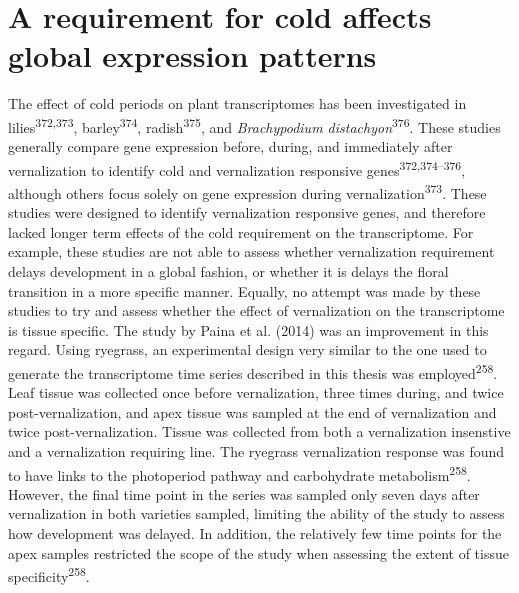 \documentclass[12pt,]{book}
\begin{document}
\section{A requirement for cold affects global expression
patterns}\label{section:winter:global}

The effect of cold periods on plant transcriptomes has been investigated
in lilies\textsuperscript{372,373}, barley\textsuperscript{374},
radish\textsuperscript{375}, and \emph{Brachypodium
distachyon}\textsuperscript{376}. These studies generally compare gene
expression before, during, and immediately after vernalization to
identify cold and vernalization responsive
genes\textsuperscript{372,374--376}, although others focus solely on
gene expression during vernalization\textsuperscript{373}. These studies
were designed to identify vernalization responsive genes, and therefore
lacked longer term effects of the cold requirement on the transcriptome.
For example, these studies are not able to assess whether vernalization
requirement delays development in a global fashion, or whether it is
delays the floral transition in a more specific manner. Equally, no
attempt was made by these studies to try and assess whether the effect
of vernalization on the transcriptome is tissue specific. The study by
Paina et al. (2014) was an improvement in this regard. Using ryegrass,
an experimental design very similar to the one used to generate the
transcriptome time series described in this thesis was
employed\textsuperscript{258}. Leaf tissue was collected once before
vernalization, three times during, and twice post-vernalization, and
apex tissue was sampled at the end of vernalization and twice
post-vernalization. Tissue was collected from both a vernalization
insenstive and a vernalization requiring line. The ryegrass
vernalization response was found to have links to the photoperiod
pathway and carbohydrate metabolism\textsuperscript{258}. However, the
final time point in the series was sampled only seven days after
vernalization in both varieties sampled, limiting the ability of the
study to assess how development was delayed. In addition, the relatively
few time points for the apex samples restricted the scope of the study
when assessing the extent of tissue specificity\textsuperscript{258}.
\end{document}
